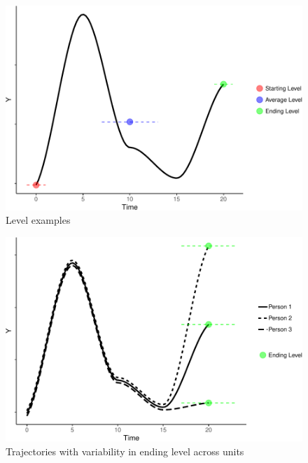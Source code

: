 \documentclass[english,,man]{apa6}
\theoremstyle{definition}
\theoremstyle{definition}
\theoremstyle{definition}
\theoremstyle{remark}
\begin{document}
\begin{figure}
\centering
\includegraphics{figures/unnamed-chunk-7-1.pdf}
\caption{\label{fig:unnamed-chunk-7}Level examples\label{level}}
\end{figure}

\begin{figure}
\centering
\includegraphics{figures/unnamed-chunk-8-1.pdf}
\caption{\label{fig:unnamed-chunk-8}Trajectories with variability in ending
level across units\label{level_var}}
\end{figure}
\end{document}
